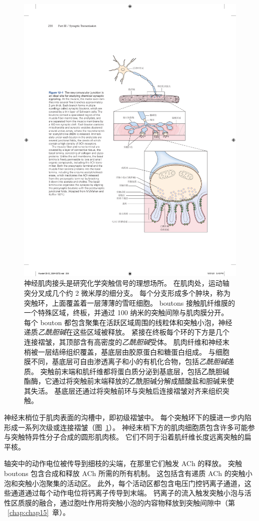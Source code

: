 \begin{figure}[htbp]
	\centering
	\includegraphics[width=0.6\linewidth]{chap12/fig_12_1}
	\caption{神经肌肉接头是研究化学突触信号的理想场所。
		在肌肉处，运动轴突分叉成几个约 2 微米厚的细分支。
		每个分支形成多个肿块，称为突触环，上面覆盖着一层薄薄的雪旺细胞。
		boutons 接触肌纤维膜的一个特殊区域，终板，并通过 100 纳米的突触间隙与肌肉膜分开。
		每个 bouton 都包含聚集在活跃区域周围的线粒体和突触小泡，神经递质\textit{乙酰胆碱}在这些区域被释放。
		紧接在终板每个环的下方是几个连接褶皱，其顶部含有高密度的\textit{乙酰胆碱}受体。
		肌肉纤维和神经末梢被一层结缔组织覆盖，基底层由胶原蛋白和糖蛋白组成。
		与细胞膜不同，基底层可自由渗透离子和小的有机化合物，包括\textit{乙酰胆碱}递质。
		突触前末端和肌纤维都将蛋白质分泌到基底层，包括乙酰胆碱酯酶，它通过将突触前末端释放的乙酰胆碱分解成醋酸盐和胆碱来使其失活。
		基底层还通过将突触前环与突触后连接褶皱对齐来组织突触\cite{mcmahan1971visual}。}
	\label{fig:12_1}
\end{figure}


神经末梢位于肌肉表面的沟槽中，即初级褶皱中。
每个突触环下的膜进一步内陷形成一系列次级或连接褶皱（图~\ref{fig:12_1}）。
神经末梢下方的肌肉细胞质包含许多可能参与突触特异性分子合成的圆形肌肉核。
它们不同于沿着肌纤维长度远离突触的扁平核。


轴突中的动作电位被传导到细枝的尖端，在那里它们触发 ACh 的释放。
突触 boutons 包含合成和释放 ACh 所需的所有机制。
这包括含有递质 ACh 的突触小泡和突触小泡聚集的活动区。
此外，每个活动区都包含电压门控钙离子通道，这些通道通过每个动作电位将钙离子传导到末端。
钙离子的流入触发突触小泡与活性区质膜的融合，通过胞吐作用将突触小泡的内容物释放到突触间隙中（第 ~\ref{chap:chap15}~章）。


